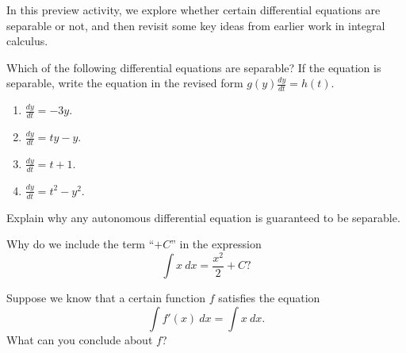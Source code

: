 \begin{pa} \label{PA:7.4}  In this preview activity, we explore whether certain differential equations are separable or not, and then revisit some key ideas from earlier work in integral calculus.
  \ba
\item Which of the following differential equations are separable?  If the equation is separable, write the equation in the revised form $g(y) \frac{dy}{dt} = h(t)$.
  \begin{enumerate}
    \item $\displaystyle \frac{dy}{dt} = -3y$.
    \item $\displaystyle \frac{dy}{dt} = ty - y$.
    \item $\displaystyle \frac{dy}{dt} = t + 1$.
    \item $\displaystyle \frac{dy}{dt} = t^2 - y^2$.
  \end{enumerate}
\item Explain why any autonomous differential equation is guaranteed to be separable.  
\item Why do we include the term ``$+C$'' in the expression $$\int x~dx =
  \frac{x^2}{2} + C?$$  
\item Suppose we know that a certain function $f$ satisfies the equation
  $$
  \int f'(x)~dx = \int x~dx.
  $$
  What can you conclude about $f$?
\ea
\end{pa} 
\afterpa
